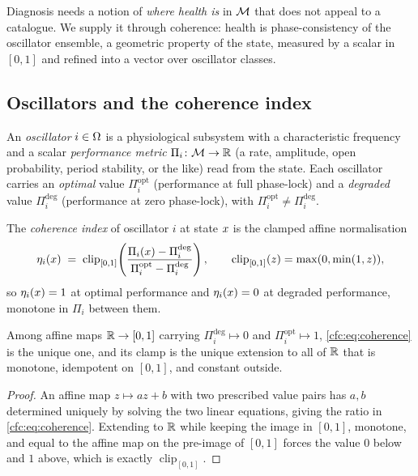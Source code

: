 Diagnosis needs a notion of \emph{where health is} in $\mathcal{M}$ that does not
appeal to a catalogue. We supply it through coherence: health is
phase-consistency of the oscillator ensemble, a geometric property of the
state, measured by a scalar in $[0,1]$ and refined into a vector over
oscillator classes.

\subsection{Oscillators and the coherence index}

\begin{definition}
\label{cfc:def:oscillator}
An \emph{oscillator} $i\in\Omega$ is a physiological subsystem with a
characteristic frequency and a scalar \emph{performance metric}
$\Pi_i\colon\mathcal{M}\to\mathbb{R}$ (a rate, amplitude, open probability, period stability,
or the like) read from the state. Each oscillator carries an \emph{optimal}
value $\Pi_i^{\mathrm{opt}}$ (performance at full phase-lock) and a
\emph{degraded} value $\Pi_i^{\mathrm{deg}}$ (performance at zero phase-lock),
with $\Pi_i^{\mathrm{opt}}\neq\Pi_i^{\mathrm{deg}}$.
\end{definition}

\begin{definition}
\label{cfc:def:coherence-index}
The \emph{coherence index} of oscillator $i$ at state $x$ is the clamped
affine normalisation
\begin{equation}
\eta_i(x)\;=\;\operatorname{clip}_{[0,1]}\!
\left(\frac{\Pi_i(x)-\Pi_i^{\mathrm{deg}}}
           {\Pi_i^{\mathrm{opt}}-\Pi_i^{\mathrm{deg}}}\right),
\qquad
\operatorname{clip}_{[0,1]}(z)=\max(0,\min(1,z)),
\label{cfc:eq:coherence}
\end{equation}
so $\eta_i(x)=1$ at optimal performance and $\eta_i(x)=0$ at degraded
performance, monotone in $\Pi_i$ between them.
\end{definition}

\begin{proposition}
\label{cfc:prop:coherence-unique}
Among affine maps $\mathbb{R}\to[0,1]$ carrying $\Pi_i^{\mathrm{deg}}\mapsto0$ and
$\Pi_i^{\mathrm{opt}}\mapsto1$, \eqref{cfc:eq:coherence} is the unique one, and its
clamp is the unique extension to all of $\mathbb{R}$ that is monotone, idempotent on
$[0,1]$, and constant outside.
\end{proposition}

\begin{proof}
An affine map $z\mapsto az+b$ with two prescribed value pairs has $a,b$
determined uniquely by solving the two linear equations, giving the ratio in
\eqref{cfc:eq:coherence}. Extending to $\mathbb{R}$ while keeping the image in $[0,1]$,
monotone, and equal to the affine map on the pre-image of $[0,1]$ forces the
value $0$ below and $1$ above, which is exactly $\operatorname{clip}_{[0,1]}$.
\end{proof}


